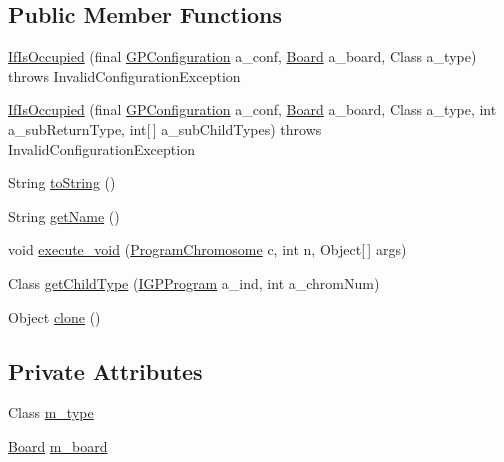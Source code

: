 \subsection*{Public Member Functions}
\begin{DoxyCompactItemize}
\item 
\hyperlink{classexamples_1_1gp_1_1tictactoe_1_1_if_is_occupied_aef59b970a07ad96da4e1257ff59e4f2b}{If\-Is\-Occupied} (final \hyperlink{classorg_1_1jgap_1_1gp_1_1impl_1_1_g_p_configuration}{G\-P\-Configuration} a\-\_\-conf, \hyperlink{classexamples_1_1gp_1_1tictactoe_1_1_board}{Board} a\-\_\-board, Class a\-\_\-type)  throws Invalid\-Configuration\-Exception 
\item 
\hyperlink{classexamples_1_1gp_1_1tictactoe_1_1_if_is_occupied_aa007c64148e4e24509eeff6892db0f01}{If\-Is\-Occupied} (final \hyperlink{classorg_1_1jgap_1_1gp_1_1impl_1_1_g_p_configuration}{G\-P\-Configuration} a\-\_\-conf, \hyperlink{classexamples_1_1gp_1_1tictactoe_1_1_board}{Board} a\-\_\-board, Class a\-\_\-type, int a\-\_\-sub\-Return\-Type, int\mbox{[}$\,$\mbox{]} a\-\_\-sub\-Child\-Types)  throws Invalid\-Configuration\-Exception 
\item 
String \hyperlink{classexamples_1_1gp_1_1tictactoe_1_1_if_is_occupied_a1943cc02a6545286f4b620fceeda90f6}{to\-String} ()
\item 
String \hyperlink{classexamples_1_1gp_1_1tictactoe_1_1_if_is_occupied_a507cbd0f96432700433d4af9067bdc93}{get\-Name} ()
\item 
void \hyperlink{classexamples_1_1gp_1_1tictactoe_1_1_if_is_occupied_acafcf34189e986d2b95b6f2e097b3447}{execute\-\_\-void} (\hyperlink{classorg_1_1jgap_1_1gp_1_1impl_1_1_program_chromosome}{Program\-Chromosome} c, int n, Object\mbox{[}$\,$\mbox{]} args)
\item 
Class \hyperlink{classexamples_1_1gp_1_1tictactoe_1_1_if_is_occupied_a2380332f5ec547562c982b02874a1b1e}{get\-Child\-Type} (\hyperlink{interfaceorg_1_1jgap_1_1gp_1_1_i_g_p_program}{I\-G\-P\-Program} a\-\_\-ind, int a\-\_\-chrom\-Num)
\item 
Object \hyperlink{classexamples_1_1gp_1_1tictactoe_1_1_if_is_occupied_ada71b10d97d3fe99b917865900918998}{clone} ()
\end{DoxyCompactItemize}
\subsection*{Private Attributes}
\begin{DoxyCompactItemize}
\item 
Class \hyperlink{classexamples_1_1gp_1_1tictactoe_1_1_if_is_occupied_aaa243ec54bc5cae35cd021f5900579de}{m\-\_\-type}
\item 
\hyperlink{classexamples_1_1gp_1_1tictactoe_1_1_board}{Board} \hyperlink{classexamples_1_1gp_1_1tictactoe_1_1_if_is_occupied_ae737c8e46c9e502066d66a55d4482d1b}{m\-\_\-board}
\end{DoxyCompactItemize}
